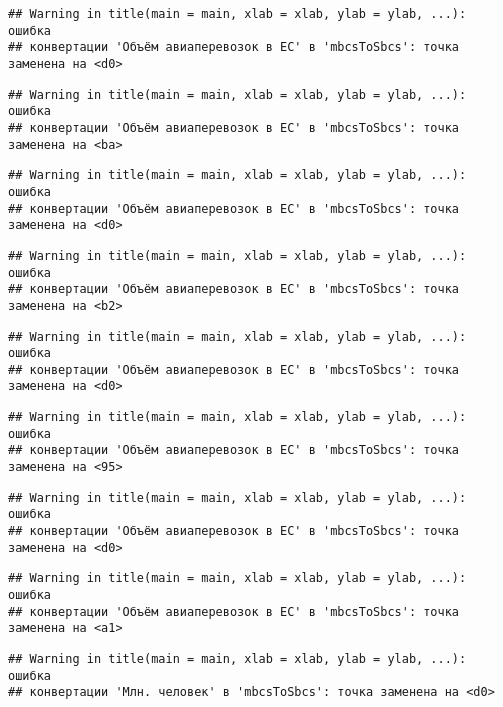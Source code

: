 \documentclass[
]{article}
\begin{document}
\begin{verbatim}
## Warning in title(main = main, xlab = xlab, ylab = ylab, ...): ошибка
## конвертации 'Объём авиаперевозок в ЕС' в 'mbcsToSbcs': точка заменена на <d0>
\end{verbatim}

\begin{verbatim}
## Warning in title(main = main, xlab = xlab, ylab = ylab, ...): ошибка
## конвертации 'Объём авиаперевозок в ЕС' в 'mbcsToSbcs': точка заменена на <ba>
\end{verbatim}

\begin{verbatim}
## Warning in title(main = main, xlab = xlab, ylab = ylab, ...): ошибка
## конвертации 'Объём авиаперевозок в ЕС' в 'mbcsToSbcs': точка заменена на <d0>
\end{verbatim}

\begin{verbatim}
## Warning in title(main = main, xlab = xlab, ylab = ylab, ...): ошибка
## конвертации 'Объём авиаперевозок в ЕС' в 'mbcsToSbcs': точка заменена на <b2>
\end{verbatim}

\begin{verbatim}
## Warning in title(main = main, xlab = xlab, ylab = ylab, ...): ошибка
## конвертации 'Объём авиаперевозок в ЕС' в 'mbcsToSbcs': точка заменена на <d0>
\end{verbatim}

\begin{verbatim}
## Warning in title(main = main, xlab = xlab, ylab = ylab, ...): ошибка
## конвертации 'Объём авиаперевозок в ЕС' в 'mbcsToSbcs': точка заменена на <95>
\end{verbatim}

\begin{verbatim}
## Warning in title(main = main, xlab = xlab, ylab = ylab, ...): ошибка
## конвертации 'Объём авиаперевозок в ЕС' в 'mbcsToSbcs': точка заменена на <d0>
\end{verbatim}

\begin{verbatim}
## Warning in title(main = main, xlab = xlab, ylab = ylab, ...): ошибка
## конвертации 'Объём авиаперевозок в ЕС' в 'mbcsToSbcs': точка заменена на <a1>
\end{verbatim}

\begin{verbatim}
## Warning in title(main = main, xlab = xlab, ylab = ylab, ...): ошибка
## конвертации 'Млн. человек' в 'mbcsToSbcs': точка заменена на <d0>
\end{verbatim}
\end{document}
